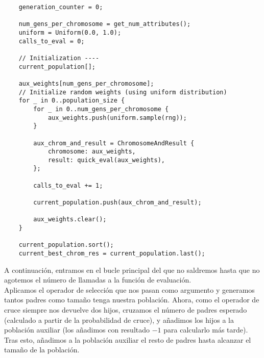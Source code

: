 \documentclass[size=a4, parskip=half, titlepage=false, toc=flat, toc=bib, 12pt]{scrartcl}
\begin{document}
\begin{verbatim}
    generation_counter = 0;

    num_gens_per_chromosome = get_num_attributes();
    uniform = Uniform(0.0, 1.0);
    calls_to_eval = 0;

    // Initialization ----
    current_population[];

    aux_weights[num_gens_per_chromosome];
    // Initialize random weights (using uniform distribution)
    for _ in 0..population_size {
        for _ in 0..num_gens_per_chromosome {
            aux_weights.push(uniform.sample(rng));
        }

        aux_chrom_and_result = ChromosomeAndResult {
            chromosome: aux_weights,
            result: quick_eval(aux_weights),
        };

        calls_to_eval += 1;

        current_population.push(aux_chrom_and_result);

        aux_weights.clear();
    }

    current_population.sort();
    current_best_chrom_res = current_population.last();
\end{verbatim}

A continuación, entramos en el bucle principal del que no saldremos hasta que no agotemos el número de llamadas a la función de evaluación. \\

Aplicamos el operador de selección que nos pasan como argumento y generamos tantos padres como tamaño tenga nuestra población. Ahora, como el operador de cruce siempre nos devuelve dos hijos, cruzamos el número de padres esperado (calculado a partir de la probabilidad de cruce), y añadimos los hijos a la población auxiliar (los añadimos con resultado $-1$ para calcularlo más tarde). Tras esto, añadimos a la población auxiliar el resto de padres hasta alcanzar el tamaño de la población.
\end{document}
